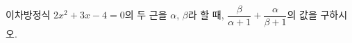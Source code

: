 이차방정식 $2x^2+3x-4=0$의 두 근을 $\alpha$, $\beta$라 할 때, $\dfrac{\beta}{\alpha+1}+\dfrac{\alpha}{\beta+1}$의 값을 구하시오.
